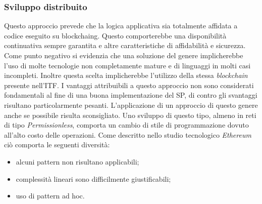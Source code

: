 \subsubsection{Sviluppo distribuito}  
Questo approccio prevede che la logica applicativa sia totalmente affidata a codice eseguito su \gls{blockchaing}. Questo comporterebbe una disponibilità continuativa sempre garantita e altre caratteristiche di affidabilità e sicurezza. Come punto negativo si evidenzia che una soluzione del genere implicherebbe l’uso di molte tecnologie non completamente mature e di linguaggi in molti casi incompleti. Inoltre questa scelta implicherebbe l’utilizzo della stessa \emph{blockchain} presente nell’ITF. I vantaggi attribuibili a questo approccio non sono considerati fondamentali al fine di una buona implementazione del SP, di contro gli svantaggi risultano particolarmente pesanti. L’applicazione di un approccio di questo genere anche se possibile risulta sconsigliato. Uno sviluppo di questo tipo, almeno in reti di tipo \emph{Permissionless}, comporta un cambio di stile di programmazione dovuto all’alto costo delle operazioni. Come descritto nello studio tecnologico \emph{Ethereum} ciò comporta le seguenti diversità:
\begin{itemize}
    \item alcuni pattern non risultano applicabili;
    \item complessità lineari sono difficilmente giustificabili;
    \item uso di pattern ad hoc.
\end{itemize}
